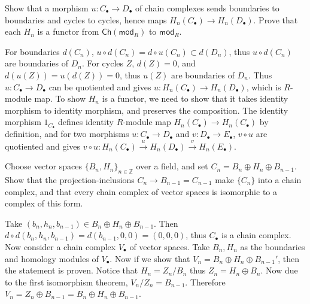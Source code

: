 \begin{exer} Show that a morphism $u:C_\bullet \rightarrow D_\bullet$ of chain complexes sends boundaries to boundaries and cycles to cycles, hence maps $H_n(C_\bullet)\rightarrow H_n(D_\bullet)$. Prove that each $H_n$ is a functor from $\mathsf{Ch}(\mathsf{mod}_R)$ to $\mathsf{mod}_R$.
\end{exer}
\begin{solution}
For boundaries $d(C_n)$, $u\circ d(C_n)=d\circ u(C_n)\subset d(D_n)$, thus $u\circ d(C_n)$ are boundaries of $D_n$. For cycles $Z$, $d(Z)=0$, and $d(u(Z))=u(d(Z))=0$, thus $u(Z)$ are boundaries of $D_n$. Thus $u:C_\bullet\rightarrow D_\bullet $ can be quotiented and gives $u:H_n(C_\bullet)\rightarrow H_n(D_\bullet)$, which is $R$-module map. To show $H_n$ is a functor, we need to show that it takes identity morphism to identity morphism, and preserves the composition. The identity morphism $1_{C_\bullet}$ defines identity $R$-module map $H_n(C_\bullet)\rightarrow H_n(C_\bullet)$ by definition, and for two morphisms $u:C_\bullet\rightarrow D_\bullet$ and $v:D_\bullet\rightarrow E_\bullet$, $v\circ u$ are quotiented and gives $v\circ u:H_n(C_\bullet)\xrightarrow{u} H_n(D_\bullet)\xrightarrow{v} H_n(E_\bullet)$.
\end{solution}

\begin{exer} Choose vector spaces $\{B_n,H_n\}_{n\in \mathbb{Z}}$ over a field, and set $C_n=B_n\oplus H_n\oplus B_{n-1}$. Show that the projection-inclusions $C_n\rightarrow B_{n-1}=C_{n-1}$ make $\{C_n\}$ into a chain complex, and that every chain complex of vector spaces is isomorphic to a complex of this form.
\end{exer}
\begin{solution} Take $(b_n,h_n,b_{n-1})\in B_n\oplus H_n\oplus B_{n-1}$. Then $d\circ d(b_n,h_n,b_{n-1})=d(b_{n-1},0,0)=(0,0,0)$, thus $C_\bullet$ is a chain complex. Now consider a chain complex $V_\bullet$ of vector spaces. Take $B_n,H_n$ as the boundaries and homology modules of $V_\bullet$. Now if we show that $V_n=B_n\oplus H_n\oplus B_{n-1}'$, then the statement is proven. Notice that $H_n=Z_n/B_n$ thus $Z_n=H_n\oplus B_n$. Now due to the first isomorphism theorem, $V_n/Z_n=B_{n-1}$. Therefore $V_n=Z_n\oplus B_{n-1}=B_n\oplus H_n\oplus B_{n-1}$.
\end{solution}

